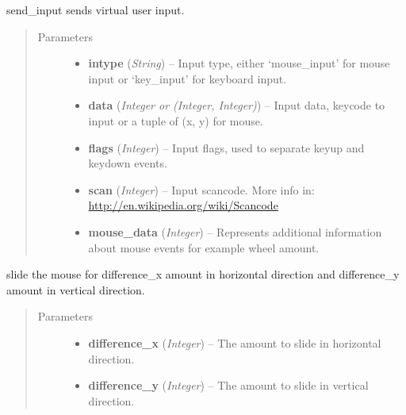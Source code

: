 \documentclass[letterpaper,10pt,english]{sphinxmanual}
\begin{document}
\begin{fulllineitems}
\label{macro:macro.send_input}
send\_input sends virtual user input.
\begin{quote}\begin{description}
\item[{Parameters}] \leavevmode\begin{itemize}
\item {} 
\textbf{intype} (\emph{String}) -- Input type, either `mouse\_input' for mouse input or `key\_input' for
keyboard input.

\item {} 
\textbf{data} (\emph{Integer or (Integer, Integer)}) -- Input data, keycode to input or a tuple of (x, y) for mouse.

\item {} 
\textbf{flags} (\emph{Integer}) -- Input flags, used to separate keyup and keydown events.

\item {} 
\textbf{scan} (\emph{Integer}) -- Input scancode. More info in: \href{http://en.wikipedia.org/wiki/Scancode}{http://en.wikipedia.org/wiki/Scancode}

\item {} 
\textbf{mouse\_data} (\emph{Integer}) -- Represents additional information about mouse events for example wheel
amount.

\end{itemize}

\end{description}\end{quote}

\end{fulllineitems}


\begin{fulllineitems}
\label{macro:macro.slide}
slide the mouse for difference\_x amount in horizontal direction and
difference\_y amount in vertical direction.
\begin{quote}\begin{description}
\item[{Parameters}] \leavevmode\begin{itemize}
\item {} 
\textbf{difference\_x} (\emph{Integer}) -- The amount to slide in horizontal direction.

\item {} 
\textbf{difference\_y} (\emph{Integer}) -- The amount to slide in vertical direction.

\end{itemize}

\end{description}\end{quote}

\end{fulllineitems}
\end{document}

